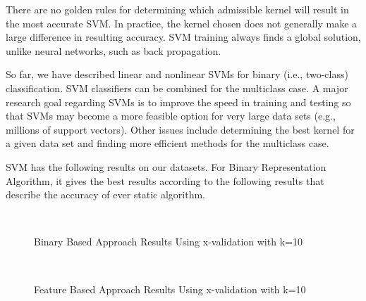 \documentclass[12pt,fleqn]{book} %
\begin{document}
There are no golden rules for determining which admissible kernel will result in the most accurate SVM. In practice, the kernel chosen does not generally make a large difference in resulting accuracy. SVM training always finds a global solution, unlike neural networks, such as back propagation.
\bigskip

So far, we have described linear and nonlinear SVMs for binary (i.e., two-class) classification. SVM classifiers can be combined for the multiclass case.  A major research goal regarding SVMs is to improve the speed in training and testing so that SVMs may become a more feasible option for very large data sets (e.g., millions of support vectors). Other issues include determining the best kernel for a given data set and finding more efficient methods for the multiclass case.\bigskip

SVM has the following results on our datasets. For Binary Representation Algorithm, it gives the best results according to the following results that describe the accuracy of ever static algorithm. \bigskip

\begin{figure}[h]
\begin{dBox}
\centering
  \mbox{
   }
   \caption{Binary Based Approach Results Using x-validation with k=10\label{fig:r_svm_b} }   
\end{dBox}   
\end{figure}

\begin{figure}[h]
\begin{dBox}
\centering
  \mbox{
   }
   \caption{Feature Based Approach Results Using x-validation with k=10\label{fig:r_svm_f} }   
\end{dBox}   
\end{figure}
\end{document}
